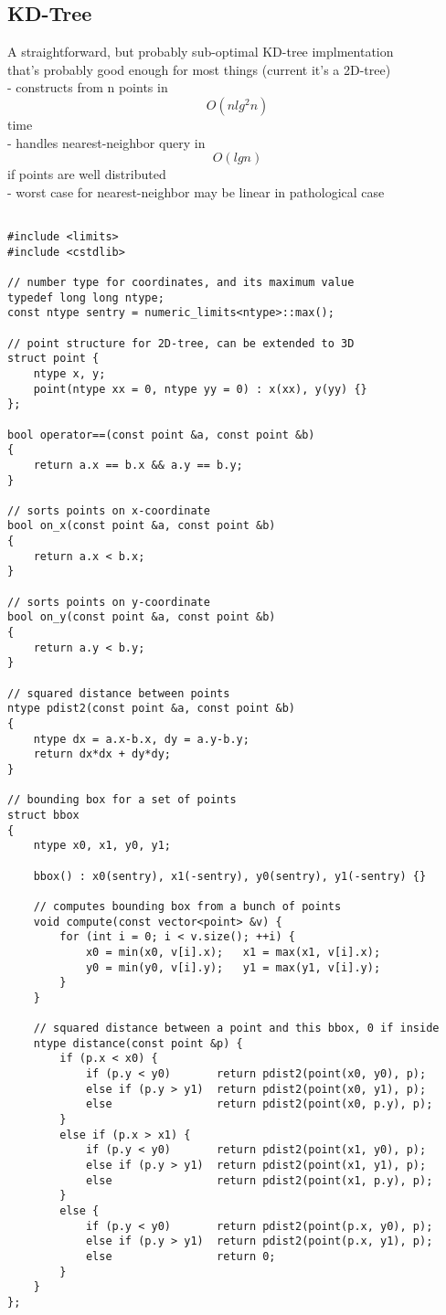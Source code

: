 \documentclass[11pt, oneside]{article}
\begin{document}
\subsection{KD-Tree}
A straightforward, but probably sub-optimal KD-tree implmentation\\
that's probably good enough for most things (current it's a 2D-tree)\\
 - constructs from n points in \[O(n lg^2 n)\] time\\
 - handles nearest-neighbor query in \[O(lg n)\] if points are well distributed\\
 - worst case for nearest-neighbor may be linear in pathological case\\
\begin{lstlisting}

#include <limits>
#include <cstdlib>

// number type for coordinates, and its maximum value
typedef long long ntype;
const ntype sentry = numeric_limits<ntype>::max();

// point structure for 2D-tree, can be extended to 3D
struct point {
    ntype x, y;
    point(ntype xx = 0, ntype yy = 0) : x(xx), y(yy) {}
};

bool operator==(const point &a, const point &b)
{
    return a.x == b.x && a.y == b.y;
}

// sorts points on x-coordinate
bool on_x(const point &a, const point &b)
{
    return a.x < b.x;
}

// sorts points on y-coordinate
bool on_y(const point &a, const point &b)
{
    return a.y < b.y;
}

// squared distance between points
ntype pdist2(const point &a, const point &b)
{
    ntype dx = a.x-b.x, dy = a.y-b.y;
    return dx*dx + dy*dy;
}

// bounding box for a set of points
struct bbox
{
    ntype x0, x1, y0, y1;
    
    bbox() : x0(sentry), x1(-sentry), y0(sentry), y1(-sentry) {}
    
    // computes bounding box from a bunch of points
    void compute(const vector<point> &v) {
        for (int i = 0; i < v.size(); ++i) {
            x0 = min(x0, v[i].x);   x1 = max(x1, v[i].x);
            y0 = min(y0, v[i].y);   y1 = max(y1, v[i].y);
        }
    }
    
    // squared distance between a point and this bbox, 0 if inside
    ntype distance(const point &p) {
        if (p.x < x0) {
            if (p.y < y0)       return pdist2(point(x0, y0), p);
            else if (p.y > y1)  return pdist2(point(x0, y1), p);
            else                return pdist2(point(x0, p.y), p);
        }
        else if (p.x > x1) {
            if (p.y < y0)       return pdist2(point(x1, y0), p);
            else if (p.y > y1)  return pdist2(point(x1, y1), p);
            else                return pdist2(point(x1, p.y), p);
        }
        else {
            if (p.y < y0)       return pdist2(point(p.x, y0), p);
            else if (p.y > y1)  return pdist2(point(p.x, y1), p);
            else                return 0;
        }
    }
};


\end{lstlisting}
\end{document}
